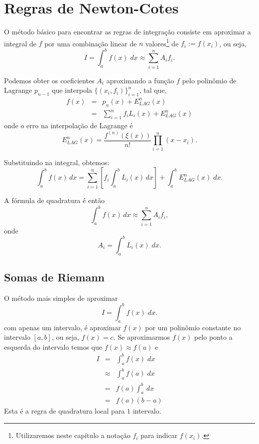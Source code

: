 \section{Regras de Newton-Cotes}

O método básico para encontrar as regras de integração consiste em aproximar a integral de $f$ por uma combinação linear de $n$ valores\footnote{Utilizaremos neste capítulo a notação $f_i$ para indicar $f(x_i)$.} de $f_i := f(x_i)$, ou seja,
\begin{equation*}
I = \int_a^b f(x) \;dx \approx \sum_{i=1}^nA_if_i.
\end{equation*}


Podemos obter os coeficientes $A_i$ aproximando a função $f$ pelo polinômio de Lagrange $p_{n-1}$ que interpola $\{(x_i,f_i)\}_{i=1}^n$, tal que,
\begin{eqnarray}
  f(x) &=& p_n(x)+E^n_{LAG}(x) \\
       &=& \sum_{i=1}^n f_iL_i(x)+E^n_{LAG}(x)
\end{eqnarray}
onde o erro na interpolação de Lagrange é
\begin{equation}
   E^n_{LAG}(x)=\frac{f^{(n)}(\xi(x))}{n!}\prod_{i=1}^n(x-x_i).
\end{equation}

Substituindo na integral, obtemos:
\begin{equation*}
  \int_a^bf(x)\,dx = \sum_{i=1}^n\left[f_i\int_a^bL_i(x)\,dx\right] +  \int_a^b E^n_{LAG}(x) \;dx.
\end{equation*}

A fórmula de quadratura é então
\begin{equation}
  \int_a^bf(x)\,dx\approx\sum_{i=1}^nA_if_i,
\end{equation}
onde
\begin{equation}
  A_i=\int_a^b L_i(x)\;dx.
\end{equation}

\subsection{Somas de Riemann}
O método mais simples de aproximar
\begin{equation*}
 I = \int_a^b f(x) \;dx.
\end{equation*}
com apenas um intervalo, é aproximar $f(x)$ por um polinômio constante no intervalo $[a,b]$, ou seja, $f(x)=c$. Se aproximarmos $f(x)$ pelo ponto a esquerda do intervalo temos que $f(x)\approx f(a)$ e
\begin{eqnarray*}
 I &=& \int_a^b f(x) \;dx\\
   &\approx& \int_a^b f(a) \;dx \\
   &=& f(a) \int_a^b\,dx\\
   &=& f(a) (b-a)
\end{eqnarray*}
Esta é a regra de quadratura local para $1$ intervalo.

